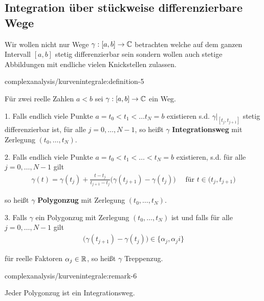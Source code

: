 \subsection{Integration über stückweise differenzierbare Wege}
\label{\detokenize{complexanalysis/kurvenintegrale:integration-uber-stuckweise-differenzierbare-wege}}
\par
Wir wollen nicht nur Wege \(\gamma:[a,b]\to\mathbb{C}\) betrachten welche auf dem ganzen Intervall \([a,b]\) stetig differenzierbar sein sondern wollen auch stetige Abbildungen mit endliche vielen Knickstellen zulassen.
\begin{definition}{}{complexanalysis/kurvenintegrale:definition-5}



\par
Für zwei reelle Zahlen \(a<b\) sei \(\gamma:[a,b]\to\mathbb{C}\) ein Weg.

\par
1. Falls endlich viele Punkte \(a=t_0<t_1<\ldots t_N =b\) existieren s.d. \(\gamma\rvert_{[t_j,t_{j+1}]}\) stetig differenzierbar ist, für alle \(j=0,\ldots, N-1\), so heißt \(\gamma\) \textbf{Integrationsweg} mit Zerlegung \((t_0,\ldots,t_N)\).

\par
2. Falls endlich viele Punkte \(a=t_0<t_1<\ldots < t_N =b\) existieren, s.d. für alle \(j=0,\ldots, N-1\) gilt
\begin{align*}
\gamma(t) = \gamma(t_j) + \frac{t - t_j}{t_{j+1} - t_j} \big(\gamma(t_{j+1}) - \gamma(t_j))\quad\text{ für } t\in(t_j,t_{j+1}\big)
\end{align*}
\par
so heißt \(\gamma\) \textbf{Polygonzug} mit Zerlegung \((t_0,\ldots,t_N)\).

\par
3. Falls \(\gamma\) ein Polygonzug mit Zerlegung \((t_0,\ldots,t_N)\) ist und falls für alle \(j=0,\ldots,N-1\) gilt
\begin{align*}
\big(\gamma(t_{j+1}) - \gamma(t_j)) \in \{ \alpha_j, \alpha_j i\}
\end{align*}
\par
für reelle Faktoren \(\alpha_j\in\mathbb{R}\), so heißt \(\gamma\) Treppenzug.
\end{definition}
\begin{remark}{}{complexanalysis/kurvenintegrale:remark-6}



\par
Jeder Polygonzug ist ein Integrationsweg.
\end{remark}

